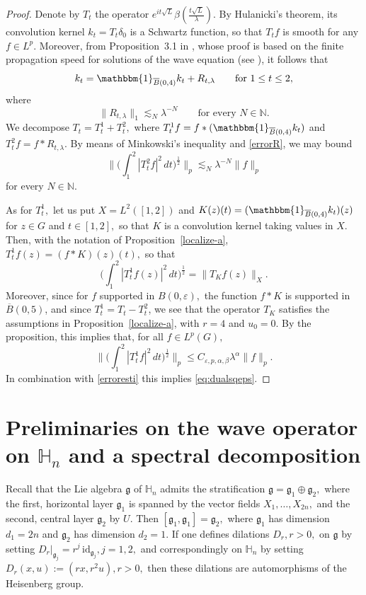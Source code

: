 \documentclass[leqno]{amsart}
\theoremstyle{definition}
\theoremstyle{remark}
\numberwithin{equation}{section}
\newcommand{\bbone}{{\mathbbm{1}}}
\newcommand\la{{\lambda}}
\newcommand\bbH{{\mathbb {H}}}
\newcommand\bbN{{\mathbb {N}}}
\newcommand\ve{{\varepsilon}}
\newcommand{\chr}{\bbone}
\newcommand{\g}{\mathfrak{g}}
\begin{document}
\begin{proof} 
Denote by $T_t$ the operator $e^{it\sqrt L}\beta (\tfrac{t\sqrt L} \la) .$ By Hulanicki's theorem, its convolution kernel 
$k_t=T_t \delta_0$ is a Schwartz function, so that  $T_tf$ is smooth for any $f\in L^p.$ Moreover, from Proposition~3.1 in  \cite{MartiniMueller-Metivier}, whose proof is based on the finite propagation speed 
for solutions of the wave equation (see \cite{Melrose86}), it follows that 
\[
k_t = \chr_{\overline{B}(0,4)} k_t+ R_{t,\lambda} \qquad \text{for}\ 1\le t\le 2,
\]
where
\begin{equation}\label{errorR}
\|R_{t,\lambda}\|_1 \lesssim_N \lambda^{-N}\qquad\text{for every } N\in\bbN.
\end{equation}
We decompose $T_t=T^1_t+T^2_t,$ where $T^1_tf=f\ast (\chr_{\overline{B}(0,4)} k_t)$ and $T^2_tf=f\ast R_{t,\lambda}.$
By means of Minkowski's inequality and \eqref{errorR}, we may bound 
\begin{equation}\label{erroresti}
\Big\| \Big(\int_1^2 |T^2_t f|^2   \,dt \Big)^{\frac{1}{2}} \Big\|_p \lesssim_N \la^{-N} \|f\|_p
\end{equation}
for every $N\in \bbN.$ 

As for $T^1_t,$ let us put $X=L^2([1,2])$  and $K(z)(t)=(\chr_{\overline{B}(0,4)} k_t)(z)$ for $z\in G$ and $t\in[1,2],$ so that $K$ is a convolution kernel taking values in $X.$ Then, with the notation of Proposition~\ref{localize-a},
$T^1_t f(z)=(f*K)(z)(t),$ so that
\[
\Big(\int_1^2 |T^1_t f(z)|^2   \,dt \Big)^{\frac{1}{2}}=\|T_K f(z)\|_X.
\]
Moreover, since for $f$ supported in $B(0,\ve),$ the function $f*K$ is supported in $\overline B(0,5)$, and since $T^1_t =T_t-T^2_t$, we see that the operator $T_K$ satisfies the assumptions  in Proposition~\ref{localize-a}, with $r=4$ and $u_0=0.$ By the proposition, this implies that,
for all $f\in L^p(G),$
\[
\Big\| \Big(\int_1^2 |T^1_t f|^2   \,dt \Big)^{\frac{1}{2}} \Big\|_p \le  C_{\ve, p,\alpha,\beta}  \la^\alpha\|f\|_p.
\]
In combination with \eqref{erroresti} this implies \eqref{eq:dualsqeps}.
\end{proof} 
 
 

\section{Preliminaries on the wave operator on $\mathbb H_n$  and a spectral decomposition} \label{prelimwave}

Recall that  the Lie algebra $\g$ of  $\bbH_n$ admits the stratification  $\g=\g_1\oplus\g_2,$ where the first, horizontal layer $\g_1$ is spanned by the vector fields $X_1,\dots, X_{2n},$  and the second, central layer $\g_2$ by $U.$
Then $[\g_1,\g_1]=\g_2,$  where  $\g_1$ has dimension  $d_1=2n$ and $\g_2$ has dimension  $d_2=1.$  If one defines dilations $D_r, r>0,$ on $\g$ by setting $D_r|_{\g_j}=r^j\, {\mathrm{id}}_{\g_j}, j=1,2,$ and correspondingly on  $\mathbb H_n$ by setting $D_r(x,u):= (rx,r^2u), r>0,$ then these  dilations are automorphisms of the Heisenberg group.
\end{document}
